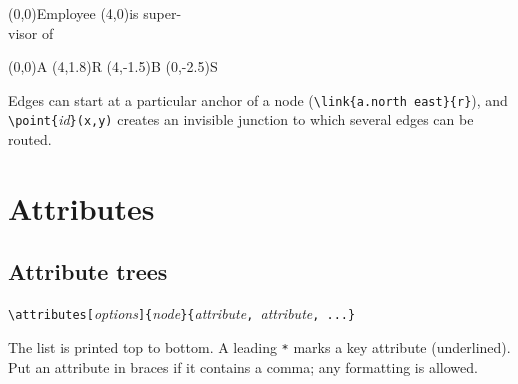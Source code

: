 \documentclass[10pt,a4paper]{article}
\newcommand\cs[1]{\texttt{\textbackslash#1}}
\newcommand\meta[1]{\textlangle\textit{#1}\textrangle}
\begin{document}
\begin{example}
\begin{erdiagram}
  (0,0){Employee}
  (4,0){is super-\\visor of}
\end{erdiagram}
\end{example}

\begin{example}
\begin{erdiagram}
  (0,0){A}
  (4,1.8){R}
  (4,-1.5){B}
  (0,-2.5){S}
\end{erdiagram}
\end{example}

Edges can start at a particular anchor of a node
(\verb|\link{a.north east}{r}|), and \cs{point}\verb|{|\meta{id}\verb|}(x,y)|
creates an invisible junction to which several edges can be routed.

\section{Attributes}\label{sec:attributes}

\subsection{Attribute trees}

\begin{center}
\verb|\attributes[|\meta{options}\verb|]{|\meta{node}\verb|}{|\meta{attribute}\verb|, |\meta{attribute}\verb|, ...}|
\end{center}

The list is printed top to bottom. A leading \texttt{*} marks a key
attribute (underlined). Put an attribute in braces if it contains a
comma; any formatting is allowed.
\end{document}
